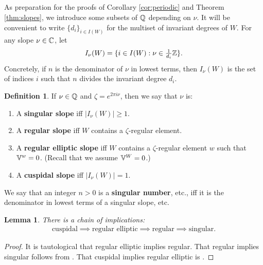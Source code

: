 \documentclass[a4paper,10pt,leqno]{amsart}
\theoremstyle{plain}
\theoremstyle{plain}
\theoremstyle{plain}
\newtheorem{lem}[thm]{Lemma}
\theoremstyle{definition}
\newtheorem{df}[thm]{Definition}
\theoremstyle{remark}
\newcommand{\dfemph}[1]{\textbf{#1}}
\newcommand{\slope}{\nu}
\begin{document}
\subsection{}

As preparation for the proofs of Corollary \ref{cor:periodic} and Theorem \ref{thm:slopes}, we introduce some subsets of $\mathbb{Q}$ depending on $\slope$.
It will be convenient to write $\{d_i\}_{i \in I(W)}$ for the multiset of invariant degrees of $W$.
For any slope $\slope \in \bb{C}$, let
\begin{align}
I_\slope(W) = \{i \in I(W) : \slope \in \tfrac{1}{d_i}\bb{Z}\}.
\end{align}
Concretely, if $n$ is the denominator of $\slope$ in lowest terms, then $I_\slope(W)$ is the set of indices $i$ such that $n$ divides the invariant degree $d_i$.

\begin{df}
If $\slope \in \bb{Q}$ and $\zeta = e^{2\pi i\slope}$, then we say that $\slope$ is:
\begin{enumerate}
\item 	A \dfemph{singular slope} iff $|I_\slope(W)| \geq 1$.
\item 	A \dfemph{regular slope} iff $W$ contains a $\zeta$-regular element.
\item 	A \dfemph{regular elliptic slope} iff $W$ contains a $\zeta$-regular element $w$ such that $\mathbb{V}^w = 0$.
		(Recall that we assume $\mathbb{V}^W = 0$.)
\item 	A \dfemph{cuspidal slope} iff $|I_\slope(W)| = 1$.
\end{enumerate}
We say that an integer $n > 0$ is a \dfemph{singular number}, etc., iff it is the denominator in lowest terms of a singular slope, etc.
\end{df}

\begin{lem}\label{lem:implication}
There is a chain of implications:
\begin{align}
\text{cuspidal}
\implies \text{regular elliptic}
\implies \text{regular}
\implies \text{singular}.
\end{align}
\end{lem}

\begin{proof}
It is tautological that regular elliptic implies regular.
That regular implies singular follows from \cite[Thm.\ 4.2(iii)]{springer_1974}.
That cuspidal implies regular elliptic is \cite[Rem.\ 3.28]{be}.
\end{proof}
\end{document}
